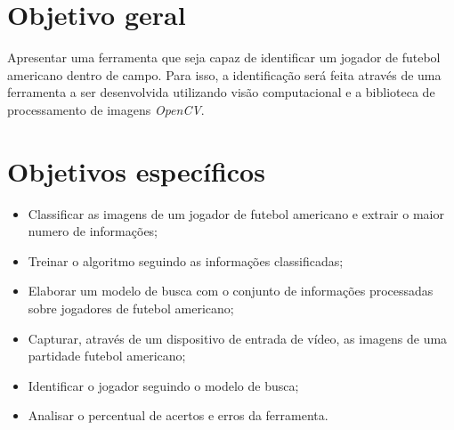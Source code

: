 \section{\textbf{{Objetivo geral}}}
\label{objetivo-geral}
Apresentar uma ferramenta que seja capaz de identificar um jogador de futebol americano dentro de campo. Para isso, a identificação será feita através de uma ferramenta a ser desenvolvida utilizando visão computacional e a biblioteca de processamento de imagens \textit{OpenCV}. 


\section{\textbf{{Objetivos específicos}}}
 \begin{itemize}
\item Classificar as imagens de um jogador de futebol americano e extrair o maior numero de informações;

\item Treinar o algoritmo seguindo as informações classificadas;

\item Elaborar um modelo de busca com o conjunto de informações processadas sobre jogadores de futebol americano;
   
\item Capturar, através de um dispositivo de entrada de vídeo, as imagens de uma partidade futebol americano;
   
\item Identificar o jogador seguindo o modelo de busca;
   
\item Analisar o percentual de acertos e erros da ferramenta.
   
 \end{itemize}